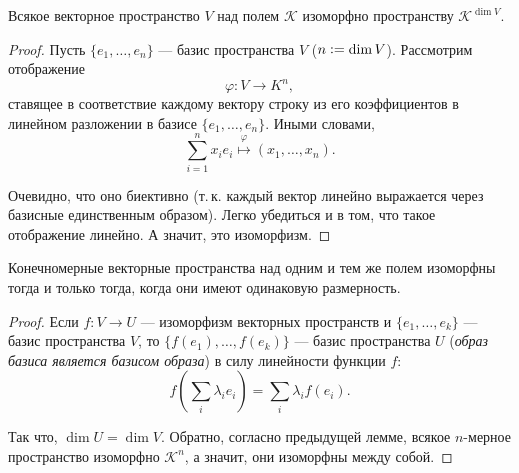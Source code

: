 \begin{lemma}
    Всякое векторное пространство $V$ над полем $\mathcal{K}$ изоморфно пространству $\mathcal{K}^{\dim V}$.
\end{lemma}

\begin{proof}
    Пусть $\{e_1, \ldots, e_n\}$ --- базис пространства $V$ ($n \vcentcolon = \dim V$). Рассмотрим отображение
    $$
    \varphi: V \rightarrow K^n,
    $$
    ставящее в соответствие каждому вектору строку из его коэффициентов в линейном разложении в базисе $\{e_1, \ldots, e_n\}$. Иными словами,
    $$
    \sum_{i = 1}^nx_ie_i \overset{\varphi}{\mapsto} (x_1, \ldots, x_n).
    $$

    Очевидно, что оно биективно (т.\,к. каждый вектор линейно выражается через базисные единственным образом). Легко убедиться и в том, что такое отображение линейно. А значит, это изоморфизм.
\end{proof}

\begin{theorem}[из Винберга]
    Конечномерные векторные пространства над одним и тем же полем изоморфны тогда и только тогда, когда они имеют одинаковую размерность.
\end{theorem}

\begin{proof}
    Если $f: V \rightarrow U$ --- изоморфизм векторных пространств и $\{e_1, \ldots, e_k\}$ --- базис пространства $V$, то $\{f(e_1), \ldots, f(e_k)\}$ --- базис пространства $U$ (\textit{образ базиса является базисом образа}) в силу линейности функции $f$:
    $$
    f\left(\sum_i\lambda_ie_i\right) = \sum_i\lambda_if(e_i).
    $$

    Так что, $\dim U = \dim V$. Обратно, согласно предыдущей лемме, всякое $n$-мерное пространство изоморфно $\mathcal{K}^n$, а значит, они изоморфны между собой.
\end{proof}


